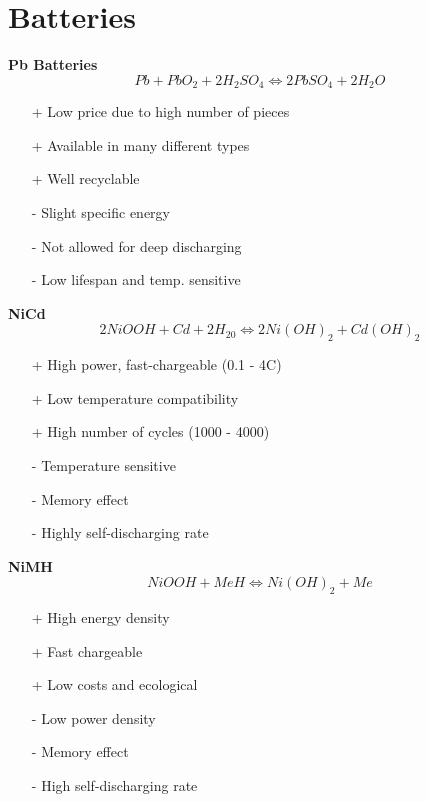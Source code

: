\section{Batteries}

\begin{multicols}{2}
{\small 	\textbf{Pb Batteries} 
	\begin{equation*}
		Pb + PbO_2 + 2H_2SO_4 \Leftrightarrow 2PbSO_4 + 2H_2O
	\end{equation*}
	
	\begin{itemize}
		\setlength{\itemsep}{0pt}
		\item[+] Low price due to high number of pieces
		\item[+] Available in many different types
		\item[+] Well recyclable
		\item[-] Slight specific energy
		\item[-] Not allowed for deep discharging
		\item[-] Low lifespan and temp. sensitive
	\end{itemize}
	
	\textbf{NiCd}
	\begin{equation*}
		2NiOOH + Cd + 2H_20 \Leftrightarrow 2Ni(OH)_2 + Cd(OH)_2
	\end{equation*}
	
	\begin{itemize}
		\setlength{\itemsep}{0pt}
		\item[+] High power, fast-chargeable (0.1 - 4C)
		\item[+] Low temperature compatibility
		\item[+] High number of cycles (1000 - 4000)
		\item[-] Temperature sensitive
		\item[-] Memory effect
		\item[-] Highly self-discharging rate
	\end{itemize}
	
	\textbf{NiMH}
	\begin{equation*}
		NiOOH + MeH \Leftrightarrow Ni(OH)_2 + Me
	\end{equation*}

	\begin{itemize}
		\setlength{\itemsep}{0pt}
		\item[+] High energy density
		\item[+] Fast chargeable
		\item[+] Low costs and ecological
		\item[-] Low power density
		\item[-] Memory effect
		\item[-] High self-discharging rate
	\end{itemize}
	
}
\end{multicols}
